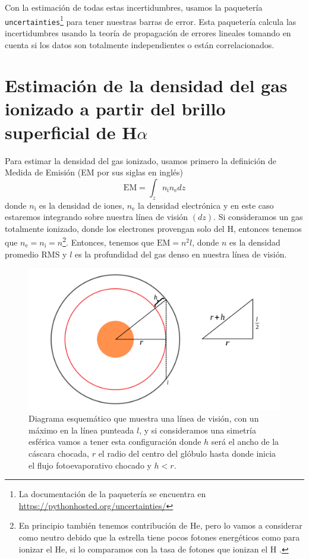 \documentclass{book}
\begin{document}
Con la estimación de todas estas incertidumbres, usamos la paquetería \verb|uncertainties|\footnote{La documentación de la paquetería se encuentra en \url{https://pythonhosted.org/uncertainties/}} para tener nuestras barras de error. Esta paquetería calcula las incertidumbres usando la teoría de propagación de errores lineales tomando en cuenta si los datos son totalmente independientes o están correlacionados.

\section{\boldmath Estimación de la densidad del gas ionizado a partir del brillo superficial de H$\alpha$}\label{Sec : estimacion de densidad}

Para estimar la densidad del gas ionizado, usamos primero la definición de Medida de Emisión (EM por sus siglas en inglés)
\begin{equation}
\mathrm{EM}=\int_z n_\mathrm{i} n_\mathrm{e}dz    
\end{equation}
donde $n_\mathrm{i}$ es la densidad de iones, $n_\mathrm{e}$ la densidad electrónica y en este caso estaremos integrando sobre nuestra línea de visión $(dz)$. Si consideramos un gas totalmente ionizado, donde los electrones provengan solo del H, entonces tenemos que $n_\mathrm{e}=n_\mathrm{i}=n$\footnote{En principio también tenemos contribución de He, pero lo vamos a considerar como neutro debido  que la estrella tiene pocos fotones energéticos como  para ionizar el He, si lo comparamos con la tasa de fotones que ionizan el H \citep{Palmira:2020}.}. Entonces, tenemos que $\mathrm{EM}=n^2l$, donde $n$ es la densidad promedio RMS y $l$ es la profundidad del gas denso en nuestra línea de visión.
 
\begin{figure}[htb]
    \centering    \includegraphics[width=\textwidth]{artesanales/ImgFi01-4.pdf}
    \caption{Diagrama esquemático que muestra una línea de visión, con un máximo en la línea punteada $l$, y si consideramos una simetría esférica vamos a tener esta configuración donde $h$ será el ancho de la cáscara chocada, $r$ el radio del centro del glóbulo hasta donde inicia el flujo fotoevaporativo chocado y $h<r$.}
    \label{fig:EM}
\end{figure}
\end{document}
